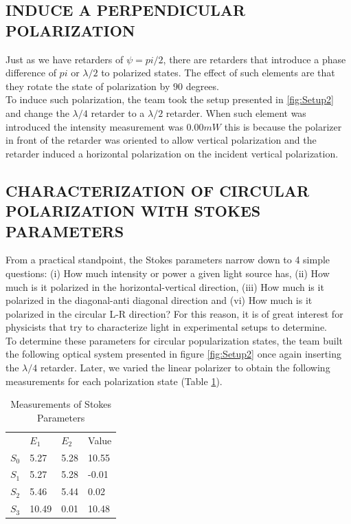 \subsection{INDUCE A PERPENDICULAR POLARIZATION}
Just as we have retarders of $\psi = pi/2$, there are retarders that introduce a phase difference of $pi$ or $\lambda/2$ to polarized states. The effect of such elements are that they rotate the state of polarization by $90$ degrees. \\

To induce such polarization, the team took the setup presented in \ref{fig:Setup2} and change the $\lambda/4$  retarder to a $\lambda/2$ retarder. When such element was introduced the intensity measurement was $0.00 mW$ this is because the polarizer in front of the retarder was oriented to allow vertical polarization and the retarder induced a horizontal polarization on the incident vertical polarization.  


\subsection{CHARACTERIZATION OF CIRCULAR POLARIZATION WITH STOKES PARAMETERS}
From a practical standpoint, the Stokes parameters narrow down to 4 simple questions: (i) How much intensity or power a given light source has, (ii) How much is it polarized in the horizontal-vertical direction, (iii) How much is it polarized in the diagonal-anti diagonal direction and (vi) How much is it polarized in the circular L-R direction? For this reason, it is of great interest for physicists that try to characterize light in experimental setups to determine. \\

To determine these parameters for circular popularization states, the team built the following optical system presented in figure \ref{fig:Setup2} once again inserting the  $\lambda/4$ retarder. Later, we varied the linear polarizer to obtain the following measurements for each polarization state (Table \ref{Tab:Stokes}). \\

\begin{table}[H]
\begin{center}
\begin{tabular}{|l|l|l|l|}
      & $E_1$ & $E_2$ & Value \\
$S_0$ & 5.27  & 5.28  & 10.55  \\
$S_1$ & 5.27  & 5.28  & -0.01   \\
$S_2$ & 5.46  & 5.44  & 0.02     \\
$S_3$ & 10.49 & 0.01  & 10.48       
\end{tabular}
\caption{Measurements of Stokes Parameters}
\label{Tab:Stokes}
\end{center}
\end{table}

